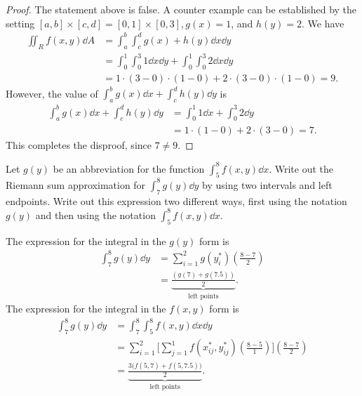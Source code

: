 \documentclass[8pt,twocolumn]{article}
\begin{document}
\begin{Answer}[number=11]
\begin{proof}
  The statement above is false. A counter example can be established by the
  setting  $[a,b]\times[c,d]=[0,1]\times[0,3], g(x) = 1$, and $h(y)=2$. We
  have
  \begin{align*}
    \iint_R f(x,y)\dd{A} &= \int_a^b\int_c^dg(x) +  h(y)\dd{x}\dd{y} \\
    &= \int_0^1\int_0^3 1 \dd{x}\dd{y} + \int_0^1\int_0^3 2 \dd{x}\dd{y} \\
    &= 1\cdot(3-0)\cdot(1-0) + 2\cdot(3-0)\cdot(1-0) = 9.
  \end{align*}
  However, the value of $\int_a^bg(x)\dd{x} +  \int_c^dh(y)\dd{y}$ is
  \begin{align*}
    \int_a^bg(x)\dd{x} +  \int_c^dh(y)\dd{y}
    &= \int_0^1 1\dd{x} + \int_0^3 2\dd{y} \\
    &= 1\cdot(1-0) + 2\cdot(3-0) = 7.
  \end{align*}
  This completes the disproof, since $7\ne9$.
\end{proof}
\end{Answer}

\begin{Exercise}[number=12]
  Let $g(y)$ be an abbreviation for the function $\int_5^8f(x,y)\dd{x}$. Write
  out the Riemann sum approximation for $\int_7^8 g(y)\dd{y}$ by using two
  intervals and left endpoints. Write out this expression two different ways,
  first using the notation $g(y)$ and then using the notation
  $\int_5^8f(x,y)\dd{x}$.
\end{Exercise}

\begin{Answer}[number=12]
  The expression for the integral in the $g(y)$ form is
  \begin{align*}
    \int_7^8 g(y) \dd{y} &= \sum_{i=1}^2g(y_i^*)(\frac{8-7}{2}) \\
    &=\underbrace{\frac{(g(7)+g(7.5))}{2}}_\text{left points}.
  \end{align*}
  The expression for the integral in the $f(x,y)$ form is
  \begin{align*}
    \int_7^8 g(y) \dd{y} &= \int_7^8\int_5^8f(x,y)\dd{x}\dd{y} \\
    &=
    \sum_{i=1}^2\Big[\sum_{j=1}^1f(x_{ij}^*,y_{ij}^*)(\frac{8-5}{1})\Big](\frac{8-7}{2}) \\
    &= \underbrace{\frac{3\big(f(5,7)+f(5,7.5)\big)}{2}}_\text{left
    points}.
  \end{align*}
\end{Answer}
\end{document}
